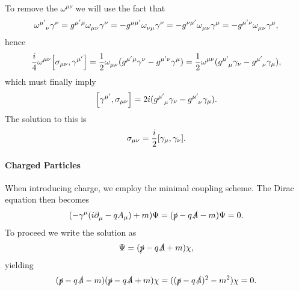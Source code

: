 To remove the $\omega^{\mu\nu}$ we will use the fact that
\begin{align*}
	\tensor{\omega}{^{\mu\p}_{\nu}}\gamma^{\nu} = g^{\mu\p\mu}\tensor{\omega}{_{\mu\nu}}\gamma^{\nu} = -g^{\mu\mu\p}\tensor{\omega}{_{\nu\mu}}\gamma^{\nu} = -g^{\nu\mu\p}\tensor{\omega}{_{\mu\nu}}\gamma^{\mu} = -g^{\mu\p\nu}\tensor{\omega}{_{\mu\nu}}\gamma^{\mu},
\end{align*}
hence
\begin{align*}
	\frac{i}{4}\omega^{\mu\nu}\comm{\sigma_{\mu\nu}}{\gamma^{\mu\p}} = \frac{1}{2}\tensor{\omega}{_{\mu\nu}}(g^{\mu\p\mu}\gamma^{\nu} - g^{\mu\p\nu}\gamma^{\mu}) = \frac{1}{2}\tensor{\omega}{^{\mu\nu}}(\tensor{g}{^{\mu\p}_{\mu}}\gamma_{\nu} - \tensor{g}{^{\mu\p}_{\nu}}\gamma_{\mu}),
\end{align*}
which must finally imply
\begin{align*}
	\comm{\gamma^{\mu\p}}{\sigma_{\mu\nu}} = 2i(\tensor{g}{^{\mu\p}_{\mu}}\gamma_{\nu} - \tensor{g}{^{\mu\p}_{\nu}}\gamma_{\mu}).
\end{align*}
The solution to this is
\begin{align*}
	\sigma_{\mu\nu} = \frac{i}{2}\comm{\gamma_{\mu}}{\gamma_{\nu}}.
\end{align*}

\paragraph{Charged Particles}
When introducing charge, we employ the minimal coupling scheme. The Dirac equation then becomes
\begin{align*}
	(-\gamma^{\mu}(i\partial^{}_{\mu} - qA_{\mu}) + m)\Psi = (\slashed{p} - q\slashed{A} - m)\Psi = 0.
\end{align*}
To proceed we write the solution as
\begin{align*}
	\Psi = (\slashed{p} - q\slashed{A} + m)\chi,
\end{align*}
yielding
\begin{align*}
	(\slashed{p} - q\slashed{A} - m)(\slashed{p} - q\slashed{A} + m)\chi = ((\slashed{p} - q\slashed{A})^{2} - m^{2})\chi = 0.
\end{align*}

